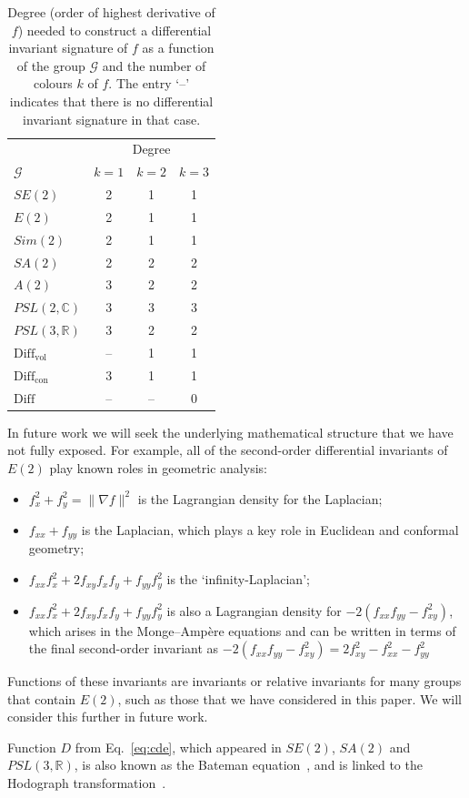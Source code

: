 \documentclass[review,onefignum,onetabnum]{siamonline190516}
\def\R{\mathbb{R}}
\begin{document}
\begin{table}[h]
\begin{center}
\begin{tabular}{| l | c c c |}
\hline
 & \multicolumn{3}{|c|}{Degree} \\
$\mathcal{G}$ & $k=1$ & $k=2$ & $k=3$ \\
\hline
$SE(2)$ & 2 &1 & 1 \\
$E(2)$ & 2 & 1 & 1 \\
$Sim(2)$ & 2 & 1 & 1 \\
$SA(2)$ & 2 & 2 & 2 \\
$A(2)$ & 3 & 2 & 2 \\
$PSL(2,\mathbb{C})$ & 3 & 3 & 3 \\
$PSL(3,\R)$ & 3 & 2 & 2 \\
$\mathrm{Diff}_{\mathrm{vol}}$ & -- & 1 & 1 \\
$\mathrm{Diff}_{\mathrm{con}}$ & 3 & 1 & 1 \\
$\mathrm{Diff}$ & -- & -- & 0 \\
\hline
\end{tabular}
\caption{Degree (order of highest derivative of $f$) needed to construct a differential invariant signature of $f$ as a function of the group $\mathcal{G}$ and the number of colours $k$ of $f$. The entry `--' indicates that there is no differential invariant signature in that case.}
\label{tab:derivs}
\end{center}
\end{table}

In future work we will seek the underlying mathematical structure that we have not fully exposed. For example, all of the second-order differential invariants of $E(2)$ play known roles in geometric analysis:

\begin{itemize}
\item $f_x^2 + f_y^2=\|\nabla f\|^2$ is the Lagrangian density for the Laplacian;
\item $f_{xx} + f_{yy}$ is the Laplacian, which plays a key role in Euclidean and conformal geometry;
\item $f_{xx}f_x^2 + 2 f_{xy} f_x f_y + f_{yy} f_y^2 $ is the `infinity-Laplacian'; 
\item $f_{xx}f_x^2 + 2 f_{xy} f_x f_y + f_{yy} f_y^2 $ is also a Lagrangian density for $-2(f_{xx} f_{yy} - f_{xy}^2)$, which arises in the Monge--Amp\`ere equations and can be written in terms of the final second-order invariant as $-2 (f_{xx} f_{yy} - f_{xy}^2) = 2 f_{xy}^2 - f_{xx}^2 - f_{yy}^2$
\end{itemize}

Functions of these invariants are invariants or relative invariants for many groups that contain $E(2)$, such as those that we have considered in this paper.  We will consider this further in future work.

Function $D$ from Eq.~\eqref{eq:cde}, which appeared in $SE(2)$, $SA(2)$ and $PSL(3,\mathbb{R})$, is also known as the Bateman equation~\citep{Andriopoulos}, and is linked to the Hodograph transformation~\citep{Rosenhaus}.




\end{document}
